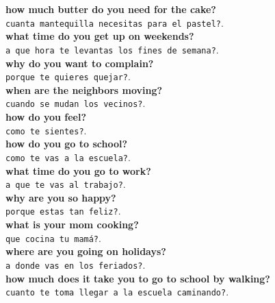\documentclass[twocolumn]{article}
\begin{document}
  \textbf{how much butter do you need for the cake?}\\\texttt{cuanta mantequilla necesitas para el pastel?}.\\
  \textbf{what time do you get up on weekends?}\\\texttt{a que hora te levantas los fines de semana?}.\\
  \textbf{why do you want to complain?}\\\texttt{porque te quieres quejar?}.\\
  \textbf{when are the neighbors moving?}\\\texttt{cuando se mudan los vecinos?}.\\
  \textbf{how do you feel?}\\\texttt{como te sientes?}.\\
  \textbf{how do you go to school?}\\\texttt{como te vas a la escuela?}.\\
  \textbf{what time do you go to work?}\\\texttt{a que te vas al trabajo?}.\\
  \textbf{why are you so happy?}\\\texttt{porque estas tan feliz?}.\\
  \textbf{what is your mom cooking?}\\\texttt{que cocina tu mam\'a?}.\\
  \textbf{where are you going on holidays?}\\\texttt{a donde vas en los feriados?}.\\
  \textbf{how much does it take you to go to school by walking?}\\\texttt{cuanto te toma llegar a la escuela caminando?}.\\
\end{document}

